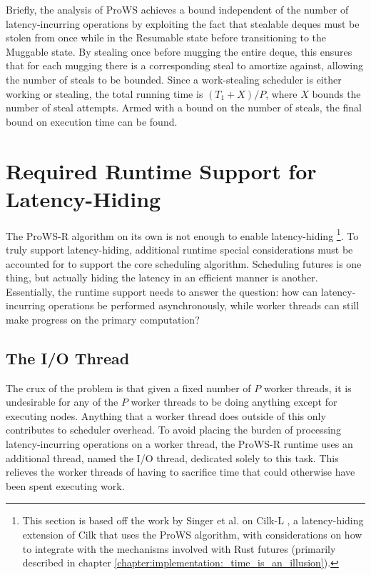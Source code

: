 \documentclass[bsc,frontabs,singlespacing,parskip,deptreport,normalheadings]{infthesis}
\begin{document}
Briefly, the analysis of ProWS achieves a bound independent of the number of
latency-incurring operations by exploiting the fact that stealable deques must
be stolen from once while in the Resumable state before transitioning to the
Muggable state. By stealing once before mugging the entire deque, this ensures
that for each mugging there is a corresponding steal to amortize against,
allowing the number of steals to be bounded. Since a work-stealing scheduler is
either working or stealing, the total running time is \((T_1 + X) / P\), where
\(X\) bounds the number of steal attempts. Armed with a bound on the number of
steals, the final bound on execution time can be found.

\section{Required Runtime Support for Latency-Hiding}
\label{section:required_runtime_support_for_latency_hiding}

The ProWS-R algorithm on its own is not enough to enable latency-hiding
\footnote{This section is based off the work by Singer et al. on Cilk-L
\cite{singer_scheduling_2019}, a latency-hiding extension of Cilk that uses the
ProWS algorithm, with considerations on how to integrate with the mechanisms
involved with Rust futures (primarily described in chapter
\ref{chapter:implementation:_time_is_an_illusion}).}. To truly support
latency-hiding, additional runtime special considerations must be accounted for
to support the core scheduling algorithm. Scheduling futures is one thing, but
actually hiding the latency in an efficient manner is another. Essentially, the
runtime support needs to answer the question: how can latency-incurring
operations be performed asynchronously, while worker threads can still make
progress on the primary computation?

\subsection{The I/O Thread}

The crux of the problem is that given a fixed number of \(P\) worker threads, it
is undesirable for any of the \(P\) worker threads to be doing anything except
for executing nodes. Anything that a worker thread does outside of this only
contributes to scheduler overhead. To avoid placing the burden of processing
latency-incurring operations on a worker thread, the ProWS-R runtime uses an
additional thread, named the I/O thread, dedicated solely to this task. This
relieves the worker threads of having to sacrifice time that could otherwise
have been spent executing work.
\end{document}
